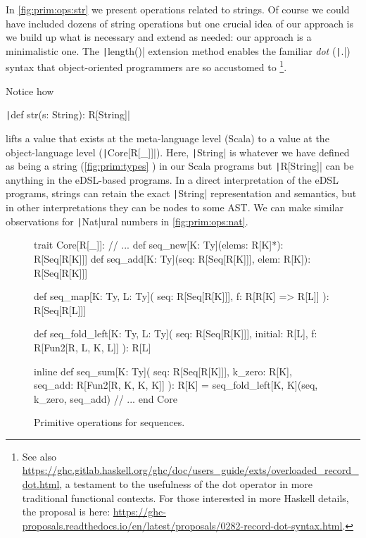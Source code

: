\documentclass[11pt]{article}
\renewcommand{\vref}[1]{\autoref{#1} \vpageref{#1}}{}
\newcommand{\ScalaI}[1]{\texttt|#1|}
\begin{document}
In \vref{fig:prim:ops:str} we present operations related to strings. Of course we could have included dozens of string operations but one crucial idea of our approach is we build up what is necessary and extend as needed: our approach is a minimalistic one. The \ScalaI{length()} extension method enables the familiar \textit{dot} (\ScalaI{.}) syntax that object-oriented programmers are so accustomed to%
\footnote{See also \href{https://ghc.gitlab.haskell.org/ghc/doc/users\_guide/exts/overloaded\_record\_dot.html}{https://ghc.gitlab.haskell.org/ghc/doc/users\_guide/exts/overloaded\_record\_dot.html}, a testament to the usefulness of the dot operator in more traditional functional contexts. For those interested in more Haskell details, the proposal is here: \href{https://ghc-proposals.readthedocs.io/en/latest/proposals/0282-record-dot-syntax.html}{https://ghc-proposals.readthedocs.io/en/latest/proposals/0282-record-dot-syntax.html}.}.

Notice how 

\par\ScalaI{def str(s: String): R[String]}

\noindent lifts a value that exists at the meta-language level (Scala) to a value at the object-language level (\ScalaI{Core[R[_]]}). Here, \ScalaI{String} is whatever we have defined as being a string (\vref{fig:prim:types}) in our Scala programs but \ScalaI{R[String]} can be anything in the eDSL-based programs. In a direct interpretation of the eDSL programs, strings can retain the exact \ScalaI{String} representation and semantics, but in other interpretations they can be nodes to some AST. We can make similar observations for \ScalaI{Nat}ural numbers in \autoref{fig:prim:ops:nat}.

\begin{figure}[tb]
\begin{ScalaBlock}
trait Core[R[_]]:
  // ...
  def seq_new[K: Ty](elems: R[K]*): R[Seq[R[K]]]
  def seq_add[K: Ty](seq: R[Seq[R[K]]], elem: R[K]): R[Seq[R[K]]]
  
  def seq_map[K: Ty, L: Ty](
    seq: R[Seq[R[K]]],
    f: R[R[K] => R[L]]
  ): R[Seq[R[L]]]
  
  def seq_fold_left[K: Ty, L: Ty](
    seq: R[Seq[R[K]]],
    initial: R[L],
    f: R[Fun2[R, L, K, L]]
  ): R[L]
  
  inline def seq_sum[K: Ty](
    seq: R[Seq[R[K]]],
    k_zero: R[K],
    seq_add: R[Fun2[R, K, K, K]]
  ): R[K] =
    seq_fold_left[K, K](seq, k_zero, seq_add)
  // ...
end Core
\end{ScalaBlock}
\caption{Primitive operations for sequences.}
\label{fig:prim:ops:seq}
\hrulefill
\end{figure}
\end{document}
